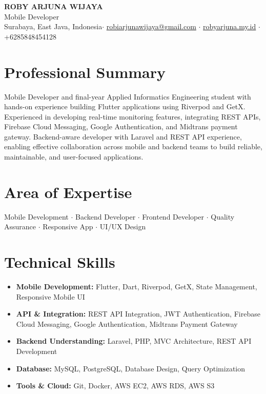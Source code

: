 \documentclass[11pt,a4paper]{article}
\makeatletter
\newcommand{\cvname}{ROBY ARJUNA WIJAYA}
\newcommand{\cvrole}{Mobile Developer}
\newcommand{\cvlocation}{Surabaya, East Java, Indonesia}
\newcommand{\cvemail}{robiarjunawijaya@gmail.com}
\newcommand{\cvwebsite}{robyarjuna.my.id}
\newcommand{\cvphone}{+6285848454128}
\makeatother
\begin{document}
\begin{center}
    {\LARGE \textbf{\color{primary}\cvname}}\\
    \vspace{2pt}
    {\large \color{accent}\cvrole}\\
    \vspace{4pt}
    \small
    \cvlocation \;$\cdot$\; 
    \href{mailto:\cvemail}{\cvemail} \;$\cdot$\; 
    \href{https://\cvwebsite/}{\cvwebsite} \;$\cdot$\; 
    \cvphone
\end{center}

\section*{Professional Summary}
Mobile Developer and final-year Applied Informatics Engineering student with hands-on experience building Flutter applications using Riverpod and GetX. Experienced in developing real-time monitoring features, integrating REST APIs, Firebase Cloud Messaging, Google Authentication, and Midtrans payment gateway. Backend-aware developer with Laravel and REST API experience, enabling effective collaboration across mobile and backend teams to build reliable, maintainable, and user-focused applications.

\section*{Area of Expertise}
Mobile Development \;$\cdot$\; Backend Developer \;$\cdot$\; Frontend Developer \;$\cdot$\; Quality Assurance \;$\cdot$\; Responsive App \;$\cdot$\; UI/UX Design

\section*{Technical Skills}
\begin{itemize}
    \item \textbf{Mobile Development:} Flutter, Dart, Riverpod, GetX, State Management, Responsive Mobile UI
    \item \textbf{API \& Integration:} REST API Integration, JWT Authentication, Firebase Cloud Messaging, Google Authentication, Midtrans Payment Gateway
    \item \textbf{Backend Understanding:} Laravel, PHP, MVC Architecture, REST API Development
    \item \textbf{Database:} MySQL, PostgreSQL, Database Design, Query Optimization
    \item \textbf{Tools \& Cloud:} Git, Docker, AWS EC2, AWS RDS, AWS S3
\end{itemize}
\end{document}
